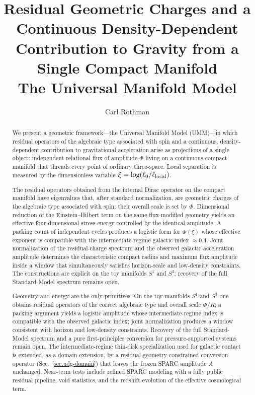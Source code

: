 \documentclass[11pt,a4paper]{article}
\title{Residual Geometric Charges and a Continuous Density-Dependent\\
Contribution to Gravity from a Single Compact Manifold\\[0.3em]
\large The Universal Manifold Model}
\author{Carl Rothman}
\date{}
\begin{document}
\maketitle

\begin{abstract}
We present a geometric framework---the Universal Manifold Model (UMM)---in which residual operators of the algebraic type associated with spin and a continuous, density-dependent contribution to gravitational acceleration arise as projections of a single object: independent relational flux of amplitude \(\Phi\) living on a continuous compact manifold that threads every point of ordinary three-space. Local separation is measured by the dimensionless variable \(\xi=\log(\ell_0/\ell_{\rm local})\).

The residual operators obtained from the internal Dirac operator on the compact manifold have eigenvalues that, after standard normalization, are geometric charges of the algebraic type associated with spin; their overall scale is set by \(\Phi\). Dimensional reduction of the Einstein--Hilbert term on the same flux-modified geometry yields an effective four-dimensional stress-energy controlled by the identical amplitude. A packing count of independent cycles produces a logistic form for \(\Phi(\xi)\) whose effective exponent is compatible with the intermediate-regime galactic index \(\approx0.4\). Joint normalization of the residual-charge spectrum and the observed galactic acceleration amplitude determines the characteristic compact radius and maximum flux amplitude inside a window that simultaneously satisfies horizon-scale and low-density constraints. The constructions are explicit on the toy manifolds \(S^1\) and \(S^3\); recovery of the full Standard-Model spectrum remains open.

Geometry and energy are the only primitives. On the toy manifolds \(S^1\) and \(S^3\) one obtains residual operators of the correct algebraic type and overall scale \(\Phi/R\); a packing argument yields a logistic amplitude whose intermediate-regime index is compatible with the observed galactic index; joint normalization produces a window consistent with horizon and low-density constraints. Recovery of the full Standard-Model spectrum and a pure first-principles conversion for pressure-supported systems remain open. The intermediate-regime thin-disk specialization used for galactic contact is extended, as a domain extension, by a residual-geometry-constrained conversion operator (Sec.~\ref{sec:udg-domain}) that leaves the frozen SPARC amplitude \(A\) unchanged. Near-term tests include refined SPARC modeling with a fully public residual pipeline, void statistics, and the redshift evolution of the effective cosmological term.
\end{abstract}
\end{document}
